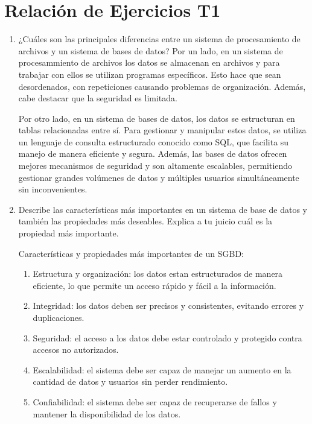 \section{Relación de Ejercicios T1}

\begin{enumerate}
    \item ¿Cuáles son las principales diferencias entre un sistema de procesamiento de archivos y un sistema de bases de datos?
    Por un lado, en un sistema de procesammiento de archivos los datos se almacenan en archivos y para trabajar con ellos se utilizan programas específicos. Esto hace que sean desordenados, con repeticiones causando problemas de organización. Además, cabe destacar que la seguridad es limitada. 

    Por otro lado, en un sistema de bases de datos, los datos se estructuran en tablas relacionadas entre sí. Para gestionar y manipular estos datos, se utiliza un lenguaje de consulta estructurado conocido como SQL, que facilita su manejo de manera eficiente y segura. Además, las bases de datos ofrecen mejores mecanismos de seguridad y son altamente escalables, permitiendo gestionar grandes volúmenes de datos y múltiples usuarios simultáneamente sin inconvenientes.


    \item Describe las características más importantes en un sistema de base de datos y también las propiedades más deseables. Explica a tu juicio cuál es la propiedad más importante.
    
    Características y propiedades más importantes de un SGBD:

    \begin{enumerate}[label=\alph*)]
        \item Estructura y organización: los datos estan estructurados de manera eficiente, lo que permite un acceso rápido y fácil a la información.
        \item Integridad: los datos deben ser precisos y consistentes, evitando errores y duplicaciones.
        \item Seguridad: el acceso a los datos debe estar controlado y protegido contra accesos no autorizados.
        \item Escalabilidad: el sistema debe ser capaz de manejar un aumento en la cantidad de datos y usuarios sin perder rendimiento.
        \item Confiabilidad: el sistema debe ser capaz de recuperarse de fallos y mantener la disponibilidad de los datos.
    \end{enumerate}


\end{enumerate}
